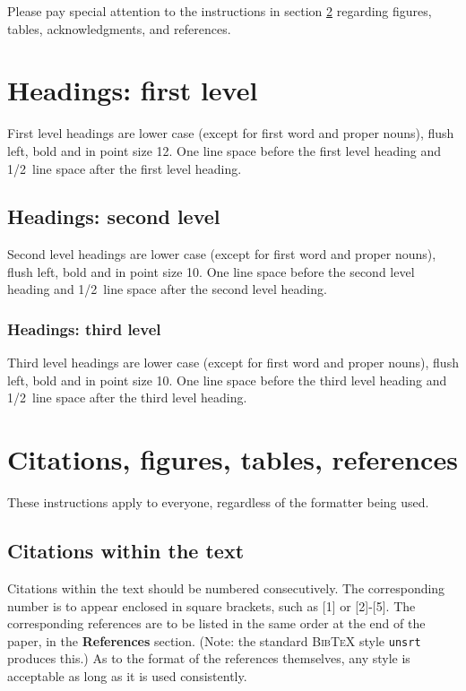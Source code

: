 \documentclass{article} %
\begin{document}
Please pay special attention to the instructions in section \ref{others}
regarding figures, tables, acknowledgments, and references.

\section{Headings: first level}
\label{headings}

First level headings are lower case (except for first word and proper nouns),
flush left, bold and in point size 12. One line space before the first level
heading and 1/2~line space after the first level heading.

\subsection{Headings: second level}

Second level headings are lower case (except for first word and proper nouns),
flush left, bold and in point size 10. One line space before the second level
heading and 1/2~line space after the second level heading.

\subsubsection{Headings: third level}

Third level headings are lower case (except for first word and proper nouns),
flush left, bold and in point size 10. One line space before the third level
heading and 1/2~line space after the third level heading.

\section{Citations, figures, tables, references}
\label{others}

These instructions apply to everyone, regardless of the formatter being used.

\subsection{Citations within the text}

Citations within the text should be numbered consecutively. The corresponding
number is to appear enclosed in square brackets, such as [1] or [2]-[5]. The
corresponding references are to be listed in the same order at the end of the
paper, in the \textbf{References} section. (Note: the standard
\textsc{Bib\TeX} style \texttt{unsrt} produces this.) As to the format of the
references themselves, any style is acceptable as long as it is used
consistently.
\end{document}
